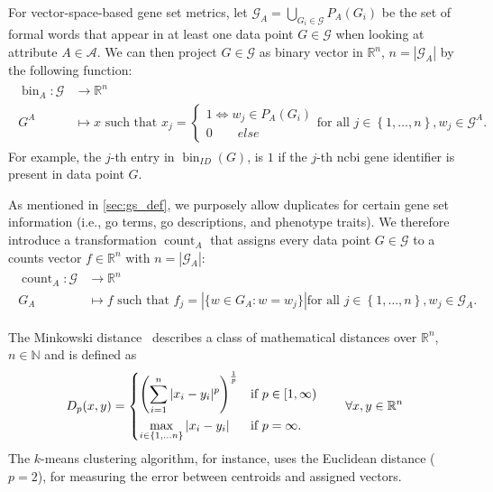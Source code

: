 \documentclass{thesisclass}
\DeclareMathOperator{\bin}{bin}
\DeclareMathOperator{\countOp}{count}
\begin{document}
For vector-space-based gene set metrics, let $\mathcal{G}_A = \bigcup_{G_i \in \mathcal{G}} P_A(G_i)$ be the set of formal words that appear in at least one data point $G \in \mathcal{G}$ when looking at attribute $A \in \mathcal{A}$.
We can then project $G \in \mathcal{G}$ as binary vector in $\mathbb{R}^n$, $n =  \left| \mathcal{G}_A \right| $ by the following function:
\begin{align} \label{eq:bin}
	\begin{split}
		\bin_A \colon \mathcal{G} & \to \mathbb{R}^n \\
		G^A & \mapsto x \text{ such that } x_j = \begin{cases}
			1 \iff w_j \in P_A(G_i) \\
			0 \qquad else
		\end{cases}\text{for all } j \in \left\lbrace 1, \ldots,  n \right\rbrace, w_j \in\mathcal{G}^A.
	\end{split}
\end{align}
For example, the $j$-th entry in $\bin_{ID}(G)$, is $1$ if the $j$-th \acrshort{ncbi} gene identifier is present in data point $G$.

As mentioned in \cref{sec:gs_def}, we purposely allow duplicates for certain gene set information (i.e., \acrshort{go} terms, \acrshort{go} descriptions, and phenotype traits). 
We therefore introduce a transformation $\countOp_A$ that assigns every data point $G \in \mathcal{G}$ to a counts vector $f \in \mathbb{R}^n$ with $n =  \left| \mathcal{G}_A \right|$: 
\begin{align} \label{eq:count}
	\begin{split}
		\countOp_A \colon \mathcal{G} & \to \mathbb{R}^n \\
		G_A & \mapsto f \text{ such that } f_j = \left| \lbrace w \in G_A: w = w_j \rbrace \right|  \text{for all } j \in \left\lbrace 1, \ldots,  n \right\rbrace, w_j \in\mathcal{G}_A.
	\end{split}
\end{align}

The Minkowski distance~\cite{treves2006topological} describes a class of mathematical distances over $\mathbb{R}^n$, $n \in \mathbb{N}$ and is defined as
\begin{align} \label{eq:minkowski_dist}
	D_p(x,y) = \begin{dcases}
		\left( \sum_{i=1}^{n} |x_i-y_i|^p\right)^{\frac{1}{p}} & \text{if } p \in [1,\infty) \\
		\max_{i \in \lbrace 1, \ldots n \rbrace} |x_i-y_i| &\text{if } p = \infty.
	\end{dcases} \qquad \forall x, y \in \mathbb{R}^n
\end{align}
The $k$-means clustering algorithm, for instance, uses the Euclidean distance ($p=2$), for measuring the error between centroids and assigned vectors.
\end{document}
